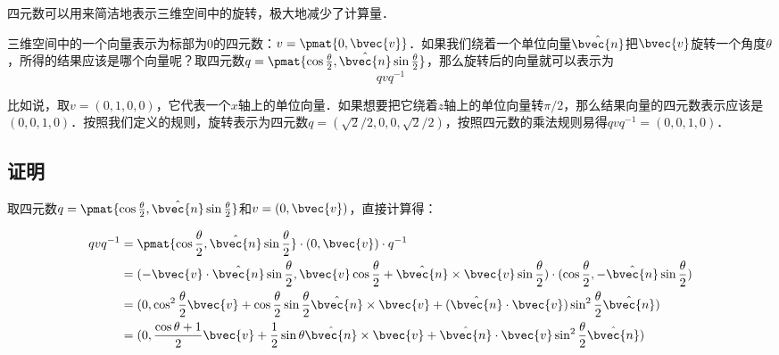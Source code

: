 
\begin{issues}
\issueAbstract
\issueTODO
\end{issues}


四元数可以用来简洁地表示三维空间中的旋转，极大地减少了计算量．

三维空间中的一个向量表示为标部为$0$的四元数：$v=\pmat{0, \bvec{v}}$．如果我们绕着一个单位向量$\hat{\bvec{n}}$把$\bvec{v}$旋转一个角度$\theta$，所得的结果应该是哪个向量呢？取四元数$q=\pmat{\cos{\frac{\theta}{2}}, \hat{\bvec{n}}\sin{\frac{\theta}{2}}}$，那么旋转后的向量就可以表示为
\begin{equation}
qvq^{-1}
\end{equation}

比如说，取$v=(0, 1, 0, 0)$，它代表一个$x$轴上的单位向量．如果想要把它绕着$z$轴上的单位向量转$\pi/2$，那么结果向量的四元数表示应该是$(0, 0, 1, 0)$．按照我们定义的规则，旋转表示为四元数$q=(\sqrt{2}/2, 0, 0, \sqrt{2}/2)$，按照四元数的乘法规则易得$qvq^{-1}=(0,0,1,0)$．

\subsection{证明}

取四元数$q=\pmat{\cos{\frac{\theta}{2}}, \hat{\bvec{n}}\sin{\frac{\theta}{2}}}$和$v=(0, \bvec{v})$，直接计算得：

\begin{equation}
\begin{aligned}
qvq^{-1}&=\pmat{\cos{\frac{\theta}{2}}, \hat{\bvec{n}}\sin{\frac{\theta}{2}}}\cdot (0, \bvec{v})\cdot q^{-1}\\&
=(-\bvec{v}\cdot\hat{\bvec{n}}\sin{\frac{\theta}{2}}, \bvec{v}\cos{\frac{\theta}{2}}+\hat{\bvec{n}}\times\bvec{v}\sin{\frac{\theta}{2}})\cdot (\cos{\frac{\theta}{2}}, -\hat{\bvec{n}}\sin{\frac{\theta}{2}})\\&
=(0, \cos^2\frac{\theta}{2}\bvec{v}+\cos\frac{\theta}{2}\sin\frac{\theta}{2}\hat{\bvec{n}}\times\bvec{v}+(\hat{\bvec{n}}\cdot\bvec{v})\sin^2\frac{\theta}{2}\hat{\bvec{n}})\\&
=(0, \frac{\cos\theta+1}{2}\bvec{v}+\frac{1}{2}\sin\theta\hat{\bvec{n}}\times\bvec{v}+\hat{\bvec{n}}\cdot\bvec{v}\sin^2\frac{\theta}{2}\hat{\bvec{n}})
\end{aligned}
\end{equation}

